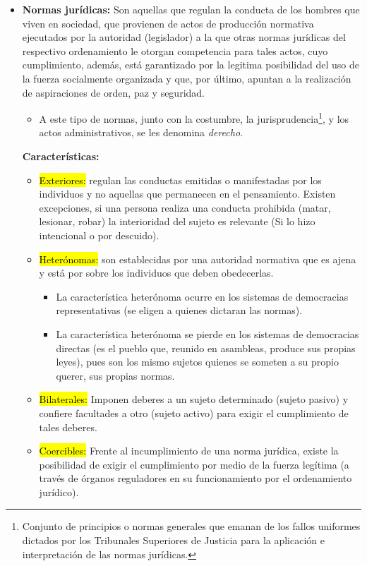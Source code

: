 \documentclass{templateApunte}
\newcommand{\hlcolor}[2]{{\sethlcolor{#1}\hl{#2}}}
\begin{document}
\begin{itemize}
  \item \textbf{Normas jurídicas:} Son aquellas que regulan la conducta de los hombres que viven en sociedad, que provienen de actos de producción normativa ejecutados por la autoridad (legislador) a la que otras normas jurídicas del respectivo ordenamiento le otorgan competencia para tales actos, cuyo cumplimiento, además, está garantizado por la legitima posibilidad del uso de la fuerza socialmente organizada y que, por último, apuntan a la realización de aspiraciones de orden, paz y seguridad.
  \begin{itemize}
    \item A este tipo de normas, junto con la costumbre, la jurisprudencia\footnote{Conjunto de principios o normas generales que emanan de los fallos uniformes dictados por los Tribunales Superiores de Justicia para la aplicación e interpretación de las normas jurídicas.}, y los actos administrativos, se les denomina \textit{derecho}.
  \end{itemize}
  \textbf{Características:}
  \begin{itemize}
    \item \hlcolor{Violeta!50}{Exteriores:} regulan las conductas emitidas o manifestadas por los individuos y no aquellas que permanecen en el pensamiento.
    Existen excepciones, si una persona realiza una conducta prohibida (matar, lesionar, robar) la interioridad del sujeto es relevante (Si lo hizo intencional o por descuido).
    
    \item \hlcolor{Violeta!50}{Heterónomas:} son establecidas por una autoridad normativa que es ajena y está por sobre los individuos que deben obedecerlas.
    \begin{itemize}
      \item La característica heterónoma ocurre en los sistemas de democracias \newline representativas (se eligen a quienes dictaran las normas). 
      \item La característica heterónoma se pierde en los sistemas de democracias directas (es el pueblo que, reunido en asambleas, produce sus propias leyes), pues son los mismo sujetos quienes se someten a su propio querer, sus propias normas.
    \end{itemize}

    \item \hlcolor{Violeta!50}{Bilaterales:} Imponen deberes a un sujeto determinado (sujeto pasivo) y confiere facultades a otro (sujeto activo) para exigir el cumplimiento de tales deberes.
    
    \item \hlcolor{Violeta!50}{Coercibles:} Frente al incumplimiento de una norma jurídica, existe la posibilidad de exigir el cumplimiento por medio de la fuerza legítima (a través de órganos reguladores en su funcionamiento por el ordenamiento jurídico).
  \end{itemize}
\end{itemize}
\end{document}
